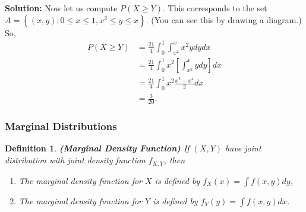 \documentclass[13pt]{article}
\newtheorem{definition}[theorem]{Definition}
\theoremstyle{definition}
\newenvironment{solution}
{\color{C2}\begin{framed}\begingroup\textbf{Solution:} }
  {\endgroup\end{framed}}
\theoremstyle{remark}
\newenvironment{remark}
  {\pushQED{\qed}\renewcommand{\qedsymbol}{$\triangle$}\remarkx}
  {\popQED\endremarkx}
\begin{document}
\begin{remark}
\begin{enumerate}
\begin{solution}
Now let us compute $P(X \geq Y)$. This corresponds to the set $A=\left\{(x, y) ; 0 \leq x \leq 1, x^{2} \leq y \leq x\right\}$. (You can see this by drawing a diagram.) So,
$$
\begin{aligned}
P(X \geq Y) & =\frac{21}{4} \int_{0}^{1} \int_{x^{2}}^{x} x^{2} y d y d x \\
& =\frac{21}{4} \int_{0}^{1} x^{2}\left[\int_{x^{2}}^{x} y d y\right] d x \\
& =\frac{21}{4} \int_{0}^{1} x^{2} \frac{x^{2}-x^{4}}{2} d x \\
& =\frac{3}{20} .
\end{aligned}
$$
\end{solution}
    \end{enumerate}
\end{remark}

 
\subsubsection{Marginal Distributions}
\begin{definition}\textbf{(Marginal Density Function)} If $(X, Y)$ have joint distribution with joint density function $f_{X, Y}$, then \begin{enumerate}[label=(\alph*)]
    \item The marginal density function for $X$ is defined by $f_{X}(x)=\int f(x, y) d y$,
    \item The marginal density function for $Y$ is defined by $f_{Y}(y)=\int f(x, y) d x$.
\end{enumerate}
\end{definition}
\end{document}
